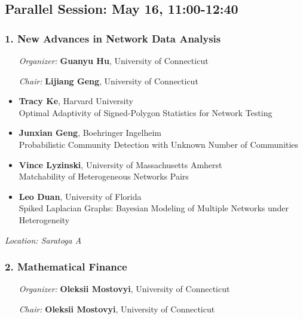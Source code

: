 
\subsection*{Parallel Session: May 16, 11:00-12:40}

\subsubsection*{1. New Advances in Network Data Analysis}

\begin{enumerate}[align=left]
\item [\emph{Organizer:}] \textbf{Guanyu Hu}, University of Connecticut
\item [\emph{Chair:}] \textbf{Lijiang Geng},  University of Connecticut
\end{enumerate}

\begin{itemize}
\item \textbf{Tracy Ke}, Harvard University \\
Optimal Adaptivity of Signed-Polygon Statistics for Network Testing
\item \textbf{Junxian Geng}, Boehringer Ingelheim \\
Probabilistic Community Detection with Unknown Number of Communities
\item \textbf{Vince Lyzinski}, University of Massachusetts Amherst \\
Matchability of Heterogeneous Networks Pairs
\item \textbf{Leo Duan}, University of Florida \\
Spiked Laplacian Graphs: Bayesian Modeling of Multiple Networks under Heterogeneity
\end{itemize}

\emph{Location: Saratoga A}

\subsubsection*{2. Mathematical Finance}

\begin{enumerate}[align=left]
\item [\emph{Organizer:}] \textbf{Oleksii Mostovyi}, University of Connecticut
\item [\emph{Chair:}] \textbf{Oleksii Mostovyi}, University of Connecticut
\end{enumerate}

